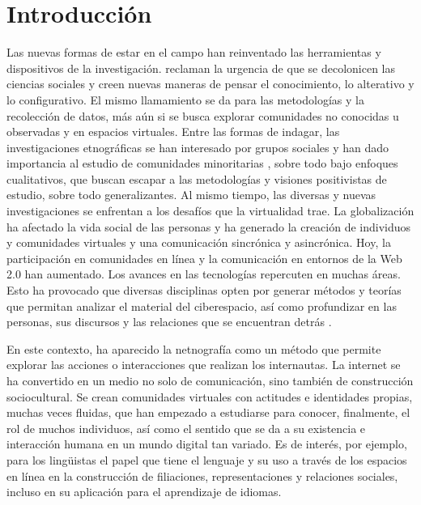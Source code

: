 \section{Introducción}\label{sec-introducción}

Las nuevas formas de estar en el campo han reinventado las herramientas
y dispositivos de la investigación. \textcite{ortizocana2019} reclaman la
urgencia de que se decolonicen las ciencias sociales y creen nuevas
maneras de pensar el conocimiento, lo alterativo y lo configurativo. El
mismo llamamiento se da para las metodologías y la recolección de datos,
más aún si se busca explorar comunidades no conocidas u observadas y en
espacios virtuales. Entre las formas de indagar, las investigaciones
etnográficas se han interesado por grupos sociales y han dado
importancia al estudio de comunidades minoritarias \cite{urzua2019}, sobre
todo bajo enfoques cualitativos, que buscan escapar a las metodologías y
visiones positivistas de estudio, sobre todo generalizantes. Al mismo
tiempo, las diversas y nuevas investigaciones se enfrentan a los
desafíos que la virtualidad trae. La globalización ha afectado la vida
social de las personas y ha generado la creación de individuos y
comunidades virtuales y una comunicación sincrónica y asincrónica. Hoy,
la participación en comunidades en línea y la comunicación en entornos
de la Web 2.0 han aumentado. Los avances en las tecnologías repercuten
en muchas áreas. Esto ha provocado que diversas disciplinas opten por
generar métodos y teorías que permitan analizar el material del
ciberespacio, así como profundizar en las personas, sus discursos y las
relaciones que se encuentran detrás \cite{lovón2023}.

En este contexto, ha aparecido la netnografía como un método que permite
explorar las acciones o interacciones que realizan los internautas. La
internet se ha convertido en un medio no solo de comunicación, sino
también de construcción sociocultural. Se crean comunidades virtuales
con actitudes e identidades propias, muchas veces fluidas, que han
empezado a estudiarse para conocer, finalmente, el rol de muchos
individuos, así como el sentido que se da a su existencia e interacción
humana en un mundo digital tan variado. Es de interés, por ejemplo, para
los lingüistas el papel que tiene el lenguaje y su uso a través de los
espacios en línea en la construcción de filiaciones, representaciones y
relaciones sociales, incluso en su aplicación para el aprendizaje de
idiomas.

